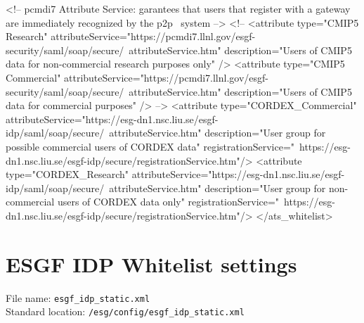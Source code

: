 \begin{tiny}
\begin{verbatimtab}[4]
    <!-- pcmdi7 Attribute Service: garantees that users that register with a gateway are immediately recognized by the p2p \
	system -->
	<!--
    <attribute type="CMIP5 Research" attributeService="https://pcmdi7.llnl.gov/esgf-security/saml/soap/secure/\
	attributeService.htm"
               description="Users of CMIP5 data for non-commercial research purposes only" />
    <attribute type="CMIP5 Commercial" attributeService="https://pcmdi7.llnl.gov/esgf-security/saml/soap/secure/\
	attributeService.htm"
               description="Users of CMIP5 data for commercial purposes" />           
	-->
    <attribute type="CORDEX_Commercial" attributeService="https://esg-dn1.nsc.liu.se/esgf-idp/saml/soap/secure/\
	attributeService.htm" description="User group for possible commercial users of CORDEX data" registrationService="\
	https://esg-dn1.nsc.liu.se/esgf-idp/secure/registrationService.htm"/>
    <attribute type="CORDEX_Research" attributeService="https://esg-dn1.nsc.liu.se/esgf-idp/saml/soap/secure/\
	attributeService.htm" description="User group for non-commercial users of CORDEX data only" registrationService="\
	https://esg-dn1.nsc.liu.se/esgf-idp/secure/registrationService.htm"/>
</ats_whitelist>
\end{verbatimtab}
\end{tiny}
\newpage
\section{ESGF IDP Whitelist settings}
File name: \texttt{esgf\_idp\_static.xml}\\
Standard location: \texttt{/esg/config/esgf\_idp\_static.xml}

